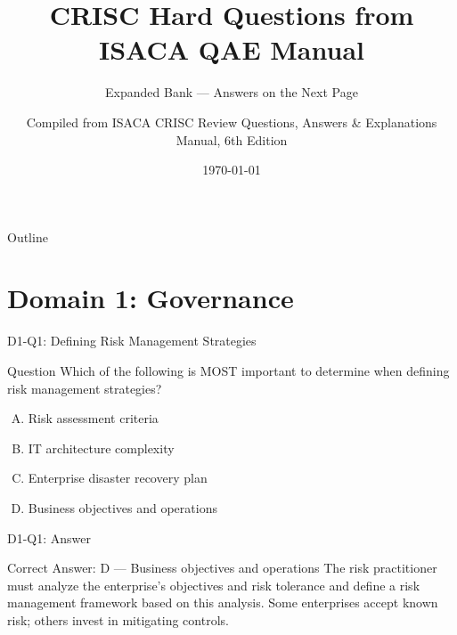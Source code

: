 \documentclass{beamer}
\title{CRISC Hard Questions from ISACA QAE Manual}
\subtitle{Expanded Bank --- Answers on the Next Page}
\author{Compiled from ISACA CRISC Review Questions, Answers \& Explanations Manual, 6th Edition}
\date{\today}
\begin{document}
	
	\begin{frame}
		\titlepage
	\end{frame}
	
	\begin{frame}{Outline}
		\tableofcontents
	\end{frame}
	
	\section{Domain 1: Governance}
	
	\begin{frame}{D1-Q1: Defining Risk Management Strategies}
		\begin{block}{Question}
			Which of the following is MOST important to determine when defining risk management strategies?
		\end{block}
		\begin{enumerate}[(A)]
			\item Risk assessment criteria
			\item IT architecture complexity
			\item Enterprise disaster recovery plan
			\item Business objectives and operations
		\end{enumerate}
	\end{frame}
	\begin{frame}{D1-Q1: Answer}
		\begin{block}{Correct Answer: D --- Business objectives and operations}
			The risk practitioner must analyze the enterprise's objectives and risk tolerance and define a risk management framework based on this analysis. Some enterprises accept known risk; others invest in mitigating controls.
		\end{block}
	\end{frame}
	
\end{document}
